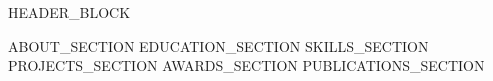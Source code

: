 \documentclass[letterpaper,12pt]{article}
\begin{document}
\begin{center}
{{HEADER_BLOCK}}
\end{center}

\vspace{-8pt}
{{ABOUT_SECTION}}
{{EDUCATION_SECTION}}
{{SKILLS_SECTION}}
{{PROJECTS_SECTION}}
{{AWARDS_SECTION}}
{{PUBLICATIONS_SECTION}}

\end{document}
